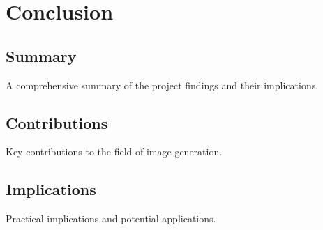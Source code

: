 \section{Conclusion}
\subsection{Summary}
A comprehensive summary of the project findings and their implications.

\subsection{Contributions}
Key contributions to the field of image generation.

\subsection{Implications}
Practical implications and potential applications.
